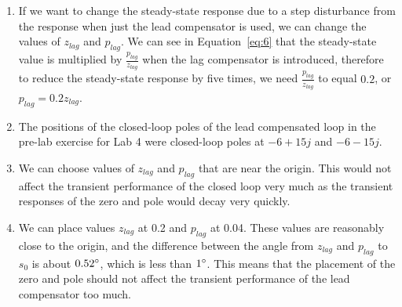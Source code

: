 \documentclass[12pt]{article}
\begin{document}
\begin{enumerate}
	\item %
	If we want to change the steady-state response due to a step disturbance from the response when just the lead compensator is used, we can change the values of $z_{lag}$ and $p_{lag}$. We can see in Equation~\ref{eq:6} that the steady-state value is multiplied by $\frac{p_{lag}}{z_{lag}}$ when the lag compensator is introduced, therefore to reduce the steady-state response by five times, we need $\frac{p_{lag}}{z_{lag}}$ to equal $0.2$, or $p_{lag} = 0.2 z_{lag}$.

	\item %
	The positions of the closed-loop poles of the lead compensated loop in the pre-lab exercise for Lab 4 were closed-loop poles at $-6 + 15j$ and $-6 - 15j$.
	
	\item %
	We can choose values of $z_{lag}$ and $p_{lag}$ that are near the origin. This would not affect the transient performance of the closed loop very much as the transient responses of the zero and pole would decay very quickly. 
	
	\item %
	We can place values $z_{lag}$ at 0.2 and $p_{lag}$ at 0.04. These values are reasonably close to the origin, and the difference between the angle from $z_{lag}$ and $p_{lag}$ to $s_0$ is about $0.52 \degree$, which is less than $1 \degree$. This means that the placement of the zero and pole should not affect the transient performance of the lead compensator too much.
	
\end{enumerate}
\end{document}
